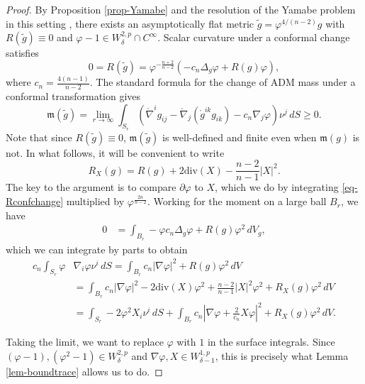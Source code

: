 \documentclass[a4paper,11pt,reqno]{amsart}
\theoremstyle{plain}
\theoremstyle{definition}
\theoremstyle{remark}
\newcommand{\m}{\mathfrak{m}}
\def\onabla{\mathring \nabla}
\numberwithin{equation}{section}
\begin{document}
\begin{proof}
	By Proposition \ref{prop-Yamabe} and the resolution of the Yamabe problem in this setting \cite{Maxwell2005ApparentHorizonBoundaries}, there exists an asymptotically flat metric $\widetilde g=\varphi^{4/(n-2)}g$ with $R(\widetilde g)\equiv 0$ and $\varphi-1\in W^{2,p}_\delta\cap C^\infty$. Scalar curvature under a conformal change satisfies
	\begin{equation}\label{eq-Rconfchange}
		0=R(\widetilde g)=\varphi^{-\frac{n+2}{n-2}}\left( -c_n\Delta_g\varphi+R(g)\varphi \right),
	\end{equation}
	where $c_n=\frac{4(n-1)}{n-2}$. The standard formula for the change of ADM mass under a conformal transformation gives
	\begin{equation}\label{eq-masschange}
		\m(\widetilde g)=\lim_{r\to \infty}\int_{S_r} \left(\onabla^i g_{ij}-\onabla_j(\mathring g^{ik}g_{ik})-c_n\nabla_j\varphi\right)\nu^j\,dS\geq0.
	\end{equation}
	Note that since $R(\widetilde g)\equiv0$, $\m(\widetilde g)$ is well-defined and finite even when $\m(g)$ is not. In what follows, it will be convenient to write
	\begin{equation*}
		R_X(g)=	R(g)+ 2\mathrm{div}(X)-\frac{n-2}{n-1}|X|^2.
	\end{equation*}
	The key to the argument is to compare $\partial\varphi$ to $X$, which we do by integrating \eqref{eq-Rconfchange} multiplied by $\varphi^{\frac{2n}{n-2}}$. Working for the moment on a large ball $B_r$, we have
	\begin{align*}
		0&=\int_{B_r}-\varphi c_n\Delta_g\varphi+R(g)\varphi^2\,dV_g,
\end{align*}
which we can integrate by parts to obtain
\begin{align*}	
		c_n\int_{S_r}\varphi&\nabla_i\varphi \nu^i\,dS=\int_{B_r}c_n|\nabla\varphi|^2+R(g)\varphi^2\,dV\nonumber\\
		&= \int_{B_r}c_n|\nabla\varphi|^2-2\mathrm{div}(X)\varphi^2+ \frac{n-2}{n-1}|X|^2\varphi^2+R_X(g)\varphi^2\,dV\nonumber\\
		&= \int_{S_r}-2\varphi^2 X_i\nu^i\,dS+\int_{B_r}c_n\left| \nabla\varphi+\frac{2}{c_n}X\varphi\right|^2+R_X(g)\varphi^2\,dV.
	\end{align*}

Taking the limit, we want to replace $\varphi$ with $1$ in the surface integrals. Since $(\varphi-1),(\varphi^2-1)\in W^{2,p}_\delta$ and $\nabla\varphi,X\in W^{1,p}_{\delta-1}$, this is precisely what Lemma \ref{lem-boundtrace} allows us to do.


\end{proof}
\end{document}
